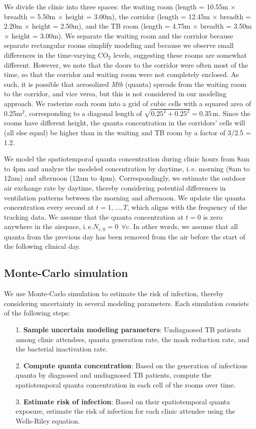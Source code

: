 \documentclass[fleqn,11pt]{wlscirep_supp}
\newcommand\ie{i.\,e.\xspace}
\begin{document}
We divide the clinic into three spaces: the waiting room (length = 10.55m $\times$ breadth = 5.50m $\times$ height = 3.00m), the corridor (length = 12.45m $\times$ breadth = 2.20m $\times$ height = 2.50m), and the TB room (length = 4.75m $\times$ breadth = 3.50m $\times$ height = 3.00m). We separate the waiting room and the corridor because separate rectangular rooms simplify modeling and because we observe small differences in the time-varying CO$_2$ levels, suggesting these rooms are somewhat different. However, we note that the doors to the corridor were often most of the time, so that the corridor and waiting room were not completely enclosed. As such, it is possible that aerosolized \emph{Mtb} (quanta) spreads from the waiting room to the corridor, and vice versa, but this is not considered in our modeling approach. We rasterize each room into a grid of cubic cells with a squared area of 0.25m$^2$, corresponding to a diagonal length of $\sqrt{0.25^2 + 0.25^2} = 0.35$\,m. Since the rooms have different height, the quanta concentration in the corridors' cells will (all else equal) be higher than in the waiting and TB room by a factor of 3/2.5 = 1.2. 

We model the spatiotemporal quanta concentration during clinic hours from 8am to 4pm and analyze the modeled concentration by daytime, \ie morning (8am to 12am) and afternoon (12am to 4pm). Correspondingly, we estimate the outdoor air exchange rate by daytime, thereby considering potential differences in ventilation patterns between the morning and afternoon. We update the quanta concentration every second at $t = 1, \dots, T$, which aligns with the frequency of the tracking data. We assume that the quanta concentration at $t=0$ is zero anywhere in the airspace, \ie $N_{c,0} = 0 ~~ \forall c$. In other words, we assume that all quanta from the previous day has been removed from the air before the start of the following clinical day. 


\subsection{Monte-Carlo simulation}

We use Monte-Carlo simulation to estimate the risk of infection, thereby considering uncertainty in several modeling parameters. Each simulation consists of the following steps:
\begin{itemize}
    \item[1.] \textbf{Sample uncertain modeling parameters}: Undiagnosed TB patients among clinic attendees, quanta generation rate, the mask reduction rate, and the bacterial inactivation rate.
    \item[2.] \textbf{Compute quanta concentration}: Based on the generation of infectious quanta by diagnosed and undiagnosed TB patients, compute the spatiotemporal quanta concentration in each cell of the rooms over time.
    \item[3.] \textbf{Estimate risk of infection}: Based on their spatiotemporal quanta exposure, estimate the risk of infection for each clinic attendee using the Wells-Riley equation.
\end{itemize}
\end{document}
